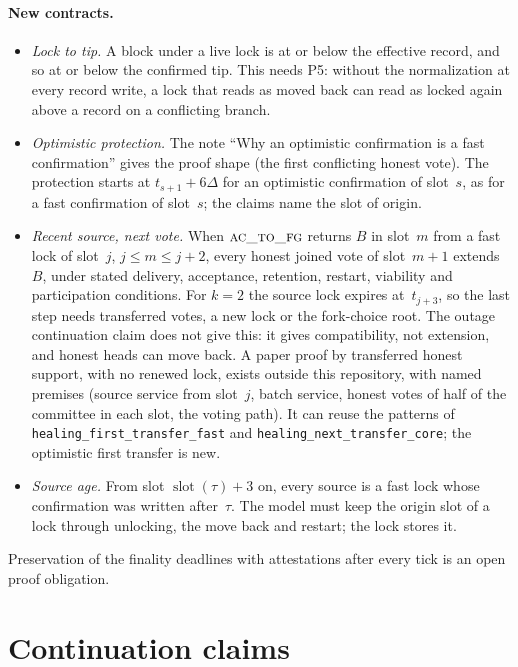\documentclass{article}
\newcommand{\slot}{\operatorname{slot}}
\newcommand{\fname}[1]{\text{\textsc{#1}}}
\begin{document}
\paragraph{New contracts.}
\begin{itemize}
\item \emph{Lock to tip.}  A block under a live lock is at or below the
  effective record, and so at or below the confirmed tip.  This needs P5:
  without the normalization at every record write, a lock that reads as
  moved back can read as locked again above a record on a conflicting
  branch.
\item \emph{Optimistic protection.}  The note ``Why an optimistic
  confirmation is a fast confirmation'' gives the proof shape (the first
  conflicting honest vote).  The protection starts at
  $t_{s+1}+6\Delta$ for an optimistic confirmation of slot~$s$, as for a
  fast confirmation of slot~$s$; the claims name the slot of origin.
\item \emph{Recent source, next vote.}  When $\fname{ac\_to\_fg}$ returns
  $B$ in slot~$m$ from a fast lock of slot~$j$, $j\leq m\leq j+2$, every
  honest joined vote of slot~$m+1$ extends~$B$, under stated delivery,
  acceptance, retention, restart, viability and participation
  conditions.  For $k=2$ the source lock expires at~$t_{j+3}$, so the last
  step needs transferred votes, a new lock or the fork-choice root.  The
  outage continuation claim does not give this: it gives compatibility,
  not extension, and honest heads can move back.  A paper proof by
  transferred honest support, with no renewed lock, exists outside this
  repository, with named premises (source service from slot~$j$, batch service, honest votes of
  half of the committee in each slot, the voting path).  It can reuse the
  patterns of \texttt{healing\_first\_transfer\_fast} and
  \texttt{healing\_next\_transfer\_core}; the optimistic first transfer is
  new.
\item \emph{Source age.}  From slot $\slot(\tau)+3$ on, every source is a
  fast lock whose confirmation was written after~$\tau$.  The model must
  keep the origin slot of a lock through unlocking, the move back and
  restart; the lock stores it.
\end{itemize}
Preservation of the finality deadlines with attestations after every tick
is an open proof obligation.

\section{Continuation claims}\label{sec:continuation-claims}
\end{document}
